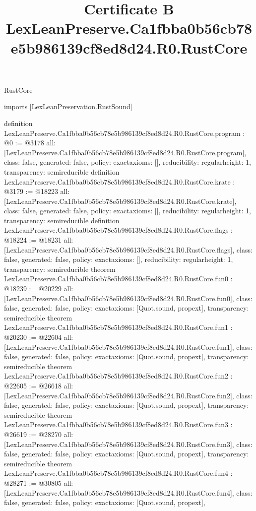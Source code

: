 \begin{lexlean}{RustCore}
\title{Certificate B LexLeanPreserve.Ca1fbba0b56cb78e5b986139cf8ed8d24.R0.RustCore}
\begin{coremodule}
imports [LexLeanPreservation.RustSound]

definition LexLeanPreserve.Ca1fbba0b56cb78e5b986139cf8ed8d24.R0.RustCore.program : @0 := @3178 {
  all: [LexLeanPreserve.Ca1fbba0b56cb78e5b986139cf8ed8d24.R0.RustCore.program],
  class: false,
  generated: false,
  policy: exact{axioms: []},
  reducibility: regular{height: 1},
  transparency: semireducible
}
definition LexLeanPreserve.Ca1fbba0b56cb78e5b986139cf8ed8d24.R0.RustCore.krate : @3179 := @18223 {
  all: [LexLeanPreserve.Ca1fbba0b56cb78e5b986139cf8ed8d24.R0.RustCore.krate],
  class: false,
  generated: false,
  policy: exact{axioms: []},
  reducibility: regular{height: 1},
  transparency: semireducible
}
definition LexLeanPreserve.Ca1fbba0b56cb78e5b986139cf8ed8d24.R0.RustCore.flags : @18224 := @18231 {
  all: [LexLeanPreserve.Ca1fbba0b56cb78e5b986139cf8ed8d24.R0.RustCore.flags],
  class: false,
  generated: false,
  policy: exact{axioms: []},
  reducibility: regular{height: 1},
  transparency: semireducible
}
theorem LexLeanPreserve.Ca1fbba0b56cb78e5b986139cf8ed8d24.R0.RustCore.fun0 : @18239 := @20229 {
  all: [LexLeanPreserve.Ca1fbba0b56cb78e5b986139cf8ed8d24.R0.RustCore.fun0],
  class: false,
  generated: false,
  policy: exact{axioms: [Quot.sound, propext]},
  transparency: semireducible
}
theorem LexLeanPreserve.Ca1fbba0b56cb78e5b986139cf8ed8d24.R0.RustCore.fun1 : @20230 := @22604 {
  all: [LexLeanPreserve.Ca1fbba0b56cb78e5b986139cf8ed8d24.R0.RustCore.fun1],
  class: false,
  generated: false,
  policy: exact{axioms: [Quot.sound, propext]},
  transparency: semireducible
}
theorem LexLeanPreserve.Ca1fbba0b56cb78e5b986139cf8ed8d24.R0.RustCore.fun2 : @22605 := @26618 {
  all: [LexLeanPreserve.Ca1fbba0b56cb78e5b986139cf8ed8d24.R0.RustCore.fun2],
  class: false,
  generated: false,
  policy: exact{axioms: [Quot.sound, propext]},
  transparency: semireducible
}
theorem LexLeanPreserve.Ca1fbba0b56cb78e5b986139cf8ed8d24.R0.RustCore.fun3 : @26619 := @28270 {
  all: [LexLeanPreserve.Ca1fbba0b56cb78e5b986139cf8ed8d24.R0.RustCore.fun3],
  class: false,
  generated: false,
  policy: exact{axioms: [Quot.sound, propext]},
  transparency: semireducible
}
theorem LexLeanPreserve.Ca1fbba0b56cb78e5b986139cf8ed8d24.R0.RustCore.fun4 : @28271 := @30805 {
  all: [LexLeanPreserve.Ca1fbba0b56cb78e5b986139cf8ed8d24.R0.RustCore.fun4],
  class: false,
  generated: false,
  policy: exact{axioms: [Quot.sound, propext]},
}
\end{coremodule}
\end{lexlean}
